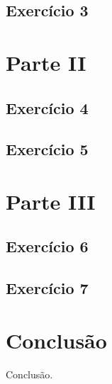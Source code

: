 \documentclass[11pt,a4paper]{report}
\begin{document}
\section{Exercício 3}


\chapter{Parte II}

\section{Exercício 4}

\section{Exercício 5}


\chapter{Parte III}

\section{Exercício 6}

\section{Exercício 7}


\chapter{Conclusão}
Conclusão.
\end{document}
